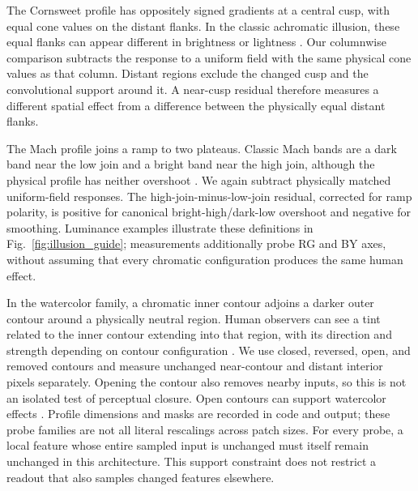 \documentclass[authoryear,preprint,review,12pt]{elsarticle}
\begin{document}
The Cornsweet profile has oppositely signed gradients at a central cusp, with equal cone values on the distant flanks. In the classic achromatic illusion, these equal flanks can appear different in brightness or lightness \citep{roe2005brightness,boyaci2007lightness}. Our columnwise comparison subtracts the response to a uniform field with the same physical cone values as that column. Distant regions exclude the changed cusp and the convolutional support around it. A near-cusp residual therefore measures a different spatial effect from a difference between the physically equal distant flanks.

The Mach profile joins a ramp to two plateaus. Classic Mach bands are a dark band near the low join and a bright band near the high join, although the physical profile has neither overshoot \citep{wallis2012mach}. We again subtract physically matched uniform-field responses. The high-join-minus-low-join residual, corrected for ramp polarity, is positive for canonical bright-high/dark-low overshoot and negative for smoothing. Luminance examples illustrate these definitions in Fig.~\ref{fig:illusion_guide}; measurements additionally probe RG and BY axes, without assuming that every chromatic configuration produces the same human effect.

In the watercolor family, a chromatic inner contour adjoins a darker outer contour around a physically neutral region. Human observers can see a tint related to the inner contour extending into that region, with its direction and strength depending on contour configuration \citep{pinna2001watercolor,devinck2006watercolor,kimura2014watercolor}. We use closed, reversed, open, and removed contours and measure unchanged near-contour and distant interior pixels separately. Opening the contour also removes nearby inputs, so this is not an isolated test of perceptual closure. Open contours can support watercolor effects \citep{cohenduwek2019filling}. Profile dimensions and masks are recorded in code and output; these probe families are not all literal rescalings across patch sizes. For every probe, a local feature whose entire sampled input is unchanged must itself remain unchanged in this architecture. This support constraint does not restrict a readout that also samples changed features elsewhere.
\end{document}
